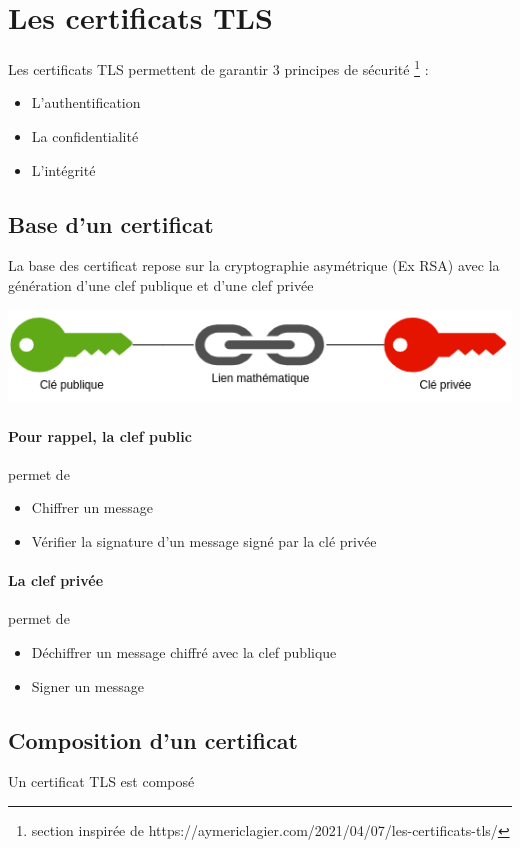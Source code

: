\documentclass[french, 12pt]{article}%
\newcommand{\itemE}{\item[$\bullet$]}
\begin{document}
\section{Les certificats TLS}
Les certificats TLS permettent de garantir 3 principes de sécurité \footnote{section inspirée de https://aymericlagier.com/2021/04/07/les-certificats-tls/} : 
\begin{itemize}
\itemE L'authentification
\itemE La confidentialité
\itemE L'intégrité
\end{itemize}

\subsection{Base d'un certificat}

La base des certificat repose sur la cryptographie asymétrique (Ex RSA) avec la génération d'une clef publique et d'une clef privée

\begin{center}
\includegraphics[scale=0.5]{./ressource/clefPubliquePrive}
\end{center}

 
\paragraph{Pour rappel, la clef public} permet de 
\begin{itemize}
\itemE Chiffrer un message
\itemE Vérifier la signature d’un message signé par la clé privée
\end{itemize}

\paragraph{La clef privée} permet de 
\begin{itemize}
\itemE Déchiffrer un message chiffré avec la clef publique
\itemE Signer un message
\end{itemize}

\subsection{Composition d'un certificat}
Un certificat TLS est composé 
\end{document}
